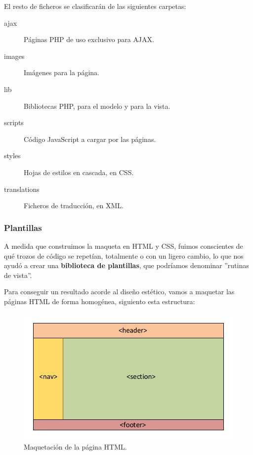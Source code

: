 El resto de ficheros se clasificarán de las siguientes carpetas:

\begin{description}
	\item[ajax] Páginas \acrshort{PHP} de uso exclusivo para \acrshort{AJAX}.
	\item[images] Imágenes para la página.
	\item[lib] Bibliotecas \acrshort{PHP}, para el modelo y para la vista.
	\item[scripts] Código JavaScript a cargar por las páginas.
	\item[styles] Hojas de estilos en cascada, en \acrshort{CSS}.
	\item[translations] Ficheros de traducción, en \acrshort{XML}.
\end{description}

\subsubsection{Plantillas}

A medida que construimos la maqueta en \acrshort{HTML} y \acrshort{CSS}, fuimos conscientes de qué trozos de código se repetían, totalmente o con un ligero cambio, lo que nos ayudó a crear una \textbf{biblioteca de plantillas}, que podríamos denominar ''rutinas de vista''.

Para conseguir un resultado acorde al diseño estético, vamos a maquetar las páginas \acrshort{HTML} de forma homogénea, siguiento esta estructura:

\smallskip

\begin{figure}[H]
	\noindent \begin{centering}
		\includegraphics[width=\linewidth*3/4]{capitulo5/html}
		\par\end{centering}
	\smallskip
	\caption{\label{fig:htnl} Maquetación de la página HTML.}
\end{figure}

